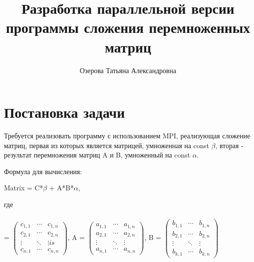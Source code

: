 \documentclass[a4paper, 16pt]{extreport}
\title  {
	Разработка параллельной версии программы сложения перемноженных	матриц}
\author {Озерова Татьяна Александровна}
\begin{document}
	\maketitle
	\tableofcontents{}
	
 	\chapter*{Постановка задачи }
 	\makeatletter
 	\renewcommand\chapter{\par
 		\thispagestyle{plain}
 		\@afterindentfalse \secdef\@chapter\@schapter} 
 	
 	Требуется реализовать программу с использованием MPI, реализующая сложение матриц, первая из которых является матрицей, умноженная на const $\beta$, вторая - результат перемножения матриц A и B, умноженный на const $\alpha$. 
 	
 	Формула  для вычисления:
 	
 	\centerline{Matrix = C*$\beta$ + A*B*$\alpha$,}
 	
 	 где \\\\\C = $\begin{pmatrix}
 		c_{1,1} & \cdots & c_{1,n} \\
 		c_{2,1} & \cdots & c_{2,n} \\
 		\vdots & \ddots & \vdots  is\\
 		c_{n,1} & \cdots & c_{n,n} 
 	\end{pmatrix}$,
 	A  = $\begin{pmatrix}
 		a_{1,1}  & \cdots & a_{1,n} \\
 		a_{2,1} & \cdots & a_{2,n} \\
 		\vdots  & \ddots & \vdots  \\
 		a_{n,1} & \cdots & a_{n,n} 
 	\end{pmatrix}$, 
 	B = $\begin{pmatrix}
 		b_{1,1}  & \cdots & b_{1,n} \\
 		b_{2,1} & \cdots & b_{2,n} \\
 		\vdots   & \ddots & \vdots  \\
 		b_{k,1} & \cdots & b_{k,n} 
 	\end{pmatrix}$  
\end{document}
